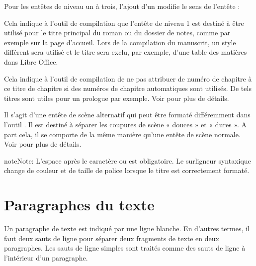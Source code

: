 \documentclass[a4paper,11pt,french]{sphinxmanual}
\begin{document}
\sphinxAtStartPar
Pour les en\sphinxhyphen{}têtes de niveau un à trois, l’ajout d’un \sphinxcode{\sphinxupquote{!}} modifie le sens de l’en\sphinxhyphen{}tête :
\begin{description}
\sphinxAtStartPar
Cela indique à l’outil de compilation que l’en\sphinxhyphen{}tête de niveau 1 est destiné à être utilisé pour le titre principal du roman ou du dossier de notes, comme par exemple sur la page d’accueil. Lors de la compilation du manuscrit, un style différent sera utilisé et le titre sera exclu, par exemple, d’une table des matières dans Libre Office.

\sphinxAtStartPar
Cela indique à l’outil de compilation de ne pas attribuer de numéro de chapitre à ce titre de chapitre si des numéros de chapitre automatiques sont utilisés. De tels titres sont utiles pour un prologue par exemple. Voir {\hyperref[\detokenize{project_structure:a-struct-heads-unnum}]{}} pour plus de détails.

\sphinxAtStartPar
Il s’agit d’une en\sphinxhyphen{}tête de scène alternatif qui peut être formaté différemment dans l’outil . Il est destiné à séparer les coupures de scène « douces » et « dures ». A part cela, il se comporte de la même manière qu’une en\sphinxhyphen{}tête de scène normale. Voir {\hyperref[\detokenize{project_structure:a-struct-heads-scenes}]{}} pour plus de détails.

\end{description}

\begin{sphinxadmonition}{note}{Note:}
\sphinxAtStartPar
L’espace après le caractère \sphinxcode{\sphinxupquote{\#}} ou \sphinxcode{\sphinxupquote{!}} est obligatoire. Le surligneur syntaxique change de couleur et de taille de police lorsque le titre est correctement formaté.
\end{sphinxadmonition}


\section{Paragraphes du texte}
\label{\detokenize{usage_format:text-paragraphs}}\label{\detokenize{usage_format:a-fmt-text}}
\sphinxAtStartPar
Un paragraphe de texte est indiqué par une ligne blanche. En d’autres termes, il faut deux sauts de ligne pour séparer deux fragments de texte en deux paragraphes. Les sauts de ligne simples sont traités comme des sauts de ligne à l’intérieur d’un paragraphe.
\end{document}
